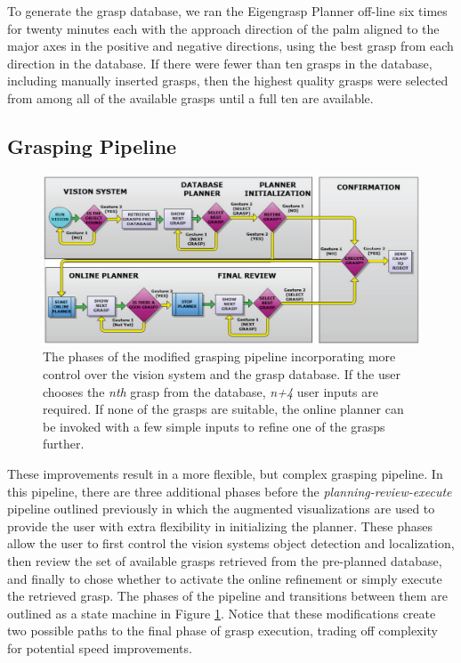 To generate the grasp database, we ran the Eigengrasp Planner off-line six times for twenty minutes each with the approach direction of the palm aligned to the major axes in the positive and negative directions, using the best grasp from each direction in the database. If there were fewer than ten grasps in the database, including manually inserted grasps, then the highest quality grasps were selected from among all of the available grasps until a full ten are available. 

\subsection{Grasping Pipeline}
\begin{figure}[ht!]
	\centering
	\includegraphics[width=1.7\columnwidth]{pipeline_2.png}
	\caption{The phases of the modified grasping pipeline incorporating more control over the vision system and the grasp database. If the user chooses the \emph{nth} grasp from the database, \emph{n+4} user inputs are required. If none of the grasps are suitable, the online planner can be invoked with a few simple inputs to refine one of the grasps further.}
	\label{fig:pipeline_2}
\end{figure}
\label{sec:pipline_2}
These improvements result in a more flexible, but complex grasping pipeline. In this pipeline, there are three additional phases before the  \emph{planning-review-execute} pipeline outlined previously in which the augmented visualizations are used to provide the user with extra flexibility in initializing the planner. These phases allow the user to first control the vision systems object detection and localization, then review the set of available grasps retrieved from the pre-planned database, and finally to chose whether to activate the online refinement or simply execute the retrieved grasp. The phases of the pipeline and transitions between them are outlined as a state machine in Figure \ref{fig:pipeline_2}. Notice that these modifications create two possible paths to the final phase of grasp execution, trading off complexity for potential speed improvements. 

